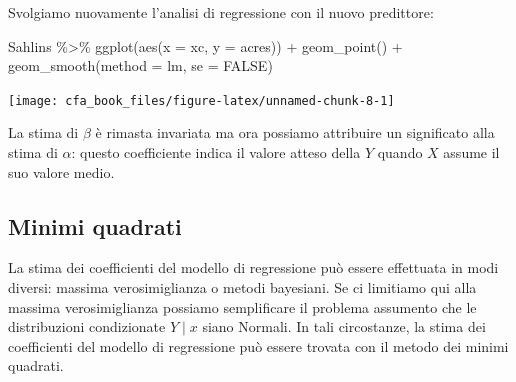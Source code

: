 \documentclass[
  11pt,
]{krantz}
\makeatletter
\newenvironment{Shaded}{\begin{snugshade}}{\end{snugshade}}
\newcommand{\AttributeTok}[1]{\textcolor[rgb]{0.61,0.61,0.61}{#1}}
\newcommand{\CommentTok}[1]{\textcolor[rgb]{0.37,0.37,0.37}{\textit{#1}}}
\newcommand{\ConstantTok}[1]{\textcolor[rgb]{0,0,0}{#1}}
\newcommand{\FunctionTok}[1]{\textcolor[rgb]{0,0,0}{#1}}
\newcommand{\NormalTok}[1]{#1}
\newcommand{\OtherTok}[1]{\textcolor[rgb]{0.37,0.37,0.37}{#1}}
\newcommand{\SpecialCharTok}[1]{\textcolor[rgb]{0,0,0}{#1}}
\newenvironment{kframe}{%
\medskip{}
\setlength{\fboxsep}{.8em}
 \def\at@end@of@kframe{}%
 \ifinner\ifhmode%
  \def\at@end@of@kframe{\end{minipage}}%
  \begin{minipage}{\columnwidth}%
 \fi\fi%
 \def\FrameCommand##1{\hskip\@totalleftmargin \hskip-\fboxsep
 \colorbox{shadecolor}{##1}\hskip-\fboxsep
     \hskip-\linewidth \hskip-\@totalleftmargin \hskip\columnwidth}%
 \MakeFramed {\advance\hsize-\width
   \@totalleftmargin\z@ \linewidth\hsize
   \@setminipage}}%
 {\par\unskip\endMakeFramed%
 \at@end@of@kframe}
\renewenvironment{Shaded}{\begin{kframe}}{\end{kframe}}
\makeatother
\begin{document}
Svolgiamo nuovamente l'analisi di regressione con il nuovo predittore:

\begin{Shaded}
\end{Shaded}

\begin{Shaded}
\begin{Highlighting}[]
\NormalTok{Sahlins }\SpecialCharTok{\%\textgreater{}\%}
  \FunctionTok{ggplot}\NormalTok{(}\FunctionTok{aes}\NormalTok{(}\AttributeTok{x =}\NormalTok{ xc, }\AttributeTok{y =}\NormalTok{ acres)) }\SpecialCharTok{+}
  \FunctionTok{geom\_point}\NormalTok{() }\SpecialCharTok{+}
  \FunctionTok{geom\_smooth}\NormalTok{(}\AttributeTok{method =}\NormalTok{ lm, }\AttributeTok{se =} \ConstantTok{FALSE}\NormalTok{)}
\end{Highlighting}
\end{Shaded}

\begin{center}\texttt{[image: cfa\_book\_files/figure-latex/unnamed-chunk-8-1]} \end{center}

La stima di \(\beta\) è rimasta invariata ma ora possiamo attribuire un significato alla stima di \(\alpha\): questo coefficiente indica il valore atteso della \(Y\) quando \(X\) assume il suo valore medio.

\hypertarget{minimi-quadrati}{%
\subsection{Minimi quadrati}\label{minimi-quadrati}}

La stima dei coefficienti del modello di regressione può essere effettuata in modi diversi: massima verosimiglianza o metodi bayesiani. Se ci limitiamo qui alla massima verosimiglianza possiamo semplificare il problema assumento che le distribuzioni condizionate \(Y \mid x\) siano Normali. In tali circostanze, la stima dei coefficienti del modello di regressione può essere trovata con il metodo dei minimi quadrati.
\end{document}
